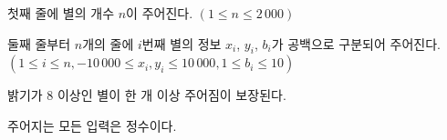 첫째 줄에 별의 개수 $n$이 주어진다. $(1 \le n \le 2\,000)$

둘째 줄부터 $n$개의 줄에 $i$번째 별의 정보 $x_i$, $y_i$, $b_i$가 공백으로 구분되어 주어진다.
$(1 \le i \le n, -10\,000 \le x_i, y_i \le 10\,000, 1 \le b_i \le 10)$

밝기가 8 이상인 별이 한 개 이상 주어짐이 보장된다.

주어지는 모든 입력은 정수이다.

